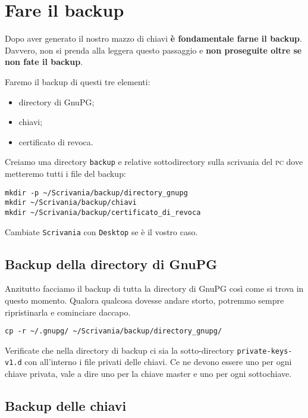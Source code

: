 \documentclass[a4paper,10pt]{article}
\begin{document}
\section{Fare il backup}

Dopo aver generato il nostro mazzo di chiavi \textbf{è fondamentale farne il backup}. Davvero, non si prenda alla leggera questo passaggio e \textbf{non proseguite oltre se non fate il backup}.

Faremo il backup di questi tre elementi:

\begin{itemize}
 \item directory di GnuPG;
 \item chiavi;
 \item certificato di revoca.
\end{itemize}

Creiamo una directory \texttt{backup} e relative sottodirectory sulla scrivania del \textsc{pc} dove metteremo tutti i file del backup:

\begin{verbatim}
mkdir -p ~/Scrivania/backup/directory_gnupg
mkdir ~/Scrivania/backup/chiavi
mkdir ~/Scrivania/backup/certificato_di_revoca
\end{verbatim}


Cambiate \texttt{Scrivania} con \texttt{Desktop} se è il vostro caso.

\subsection{Backup della directory di GnuPG}

Anzitutto facciamo il backup di tutta la directory di GnuPG così come si trova in questo momento. Qualora qualcosa dovesse andare storto, potremmo sempre ripristinarla e cominciare daccapo.

\begin{verbatim}
cp -r ~/.gnupg/ ~/Scrivania/backup/directory_gnupg/
\end{verbatim}

Verificate che nella directory di backup ci sia la sotto-directory \texttt{private-keys-v1.d} con all'interno i file privati delle chiavi. Ce ne devono essere uno per ogni chiave privata, vale a dire uno per la chiave master e uno per ogni sottochiave.

\subsection{Backup delle chiavi}
\end{document}
